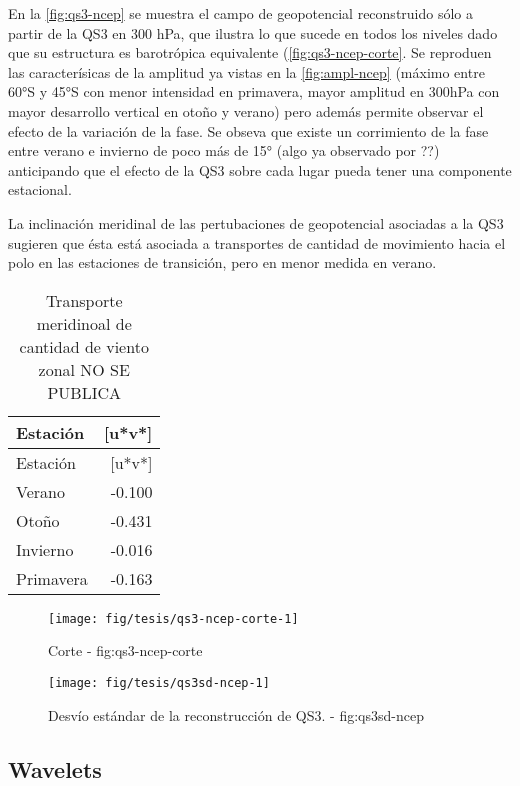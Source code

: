 \documentclass[spanish,a4paper]{book}
\begin{document}
En la \autoref{fig:qs3-ncep} se muestra el campo de geopotencial
reconstruido sólo a partir de la QS3 en 300 hPa, que ilustra lo que
sucede en todos los niveles dado que su estructura es barotrópica
equivalente (\autoref{fig:qs3-ncep-corte}. Se reproduen las
caracterísicas de la amplitud ya vistas en la \autoref{fig:ampl-ncep}
(máximo entre 60°S y 45°S con menor intensidad en primavera, mayor
amplitud en 300hPa con mayor desarrollo vertical en otoño y verano) pero
además permite observar el efecto de la variación de la fase. Se obseva
que existe un corrimiento de la fase entre verano e invierno de poco más
de 15° (algo ya observado por
??)
anticipando que el efecto de la QS3 sobre cada lugar 
pueda tener una componente estacional.

La inclinación meridinal de las pertubaciones de geopotencial asociadas
a la QS3 sugieren que ésta está asociada a transportes de cantidad de
movimiento hacia el polo en las estaciones de transición, pero en menor
medida en verano.

\begin{longtable}[]{@{}lr@{}}
\caption{Transporte meridinoal de cantidad de viento zonal NO SE
PUBLICA}\tabularnewline
\toprule
Estación & {[}u*v*{]}\tabularnewline
\midrule
\endfirsthead
\toprule
Estación & {[}u*v*{]}\tabularnewline
\midrule
\endhead
Verano & -0.100\tabularnewline
Otoño & -0.431\tabularnewline
Invierno & -0.016\tabularnewline
Primavera & -0.163\tabularnewline
\bottomrule
\end{longtable}

\begin{figure*}
\texttt{[image: fig/tesis/qs3-ncep-corte-1]} \caption{Corte - fig:qs3-ncep-corte}\label{fig:qs3-ncep-corte}
\end{figure*}

\begin{figure*}
\texttt{[image: fig/tesis/qs3sd-ncep-1]} \caption{Desvío estándar de la reconstrucción de QS3. - fig:qs3sd-ncep}\label{fig:qs3sd-ncep}
\end{figure*}


\subsection{Wavelets}\label{wavelets}
\end{document}
